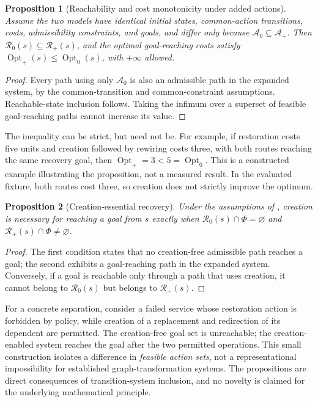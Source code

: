 \documentclass[11pt,a4paper]{article}
\newtheorem{proposition}{Proposition}
\newcommand{\Opt}{\operatorname{Opt}}
\begin{document}
\begin{proposition}[Reachability and cost monotonicity under added actions]\label{prop:monotone}
Assume the two models have identical initial states, common-action transitions, costs, admissibility constraints, and goals, and differ only because $\mathcal{A}_{0}\subseteq\mathcal{A}_{+}$. Then $\mathcal{R}_{0}(s)\subseteq\mathcal{R}_{+}(s)$, and the optimal goal-reaching costs satisfy $\Opt_{+}(s)\leq\Opt_{0}(s)$, with $+\infty$ allowed.
\end{proposition}
\begin{proof}
Every path using only $\mathcal{A}_{0}$ is also an admissible path in the expanded system, by the common-transition and common-constraint assumptions. Reachable-state inclusion follows. Taking the infimum over a superset of feasible goal-reaching paths cannot increase its value.
\end{proof}

The inequality can be strict, but need not be. For example, if restoration costs five units and creation followed by rewiring costs three, with both routes reaching the same recovery goal, then $\Opt_{+}=3<5=\Opt_{0}$. This is a constructed example illustrating the proposition, not a measured result. In the evaluated fixture, both routes cost three, so creation does not strictly improve the optimum.

\begin{proposition}[Creation-essential recovery]\label{prop:essential}
Under the assumptions of , creation is necessary for reaching a goal from $s$ exactly when $\mathcal{R}_{0}(s)\cap\Phi=\varnothing$ and $\mathcal{R}_{+}(s)\cap\Phi\ne\varnothing$.
\end{proposition}
\begin{proof}
The first condition states that no creation-free admissible path reaches a goal; the second exhibits a goal-reaching path in the expanded system. Conversely, if a goal is reachable only through a path that uses creation, it cannot belong to $\mathcal{R}_{0}(s)$ but belongs to $\mathcal{R}_{+}(s)$.
\end{proof}

For a concrete separation, consider a failed service whose restoration action is forbidden by policy, while creation of a replacement and redirection of its dependent are permitted. The creation-free goal set is unreachable; the creation-enabled system reaches the goal after the two permitted operations. This small construction isolates a difference in \emph{feasible action sets}, not a representational impossibility for established graph-transformation systems. The propositions are direct consequences of transition-system inclusion, and no novelty is claimed for the underlying mathematical principle.
\end{document}
